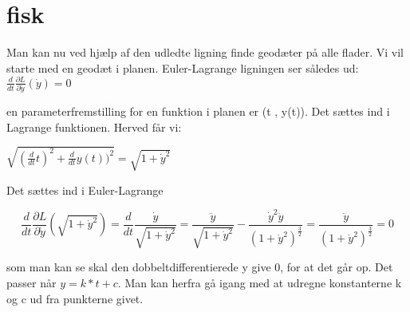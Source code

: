 \section{fisk}
Man kan nu ved hjælp af den udledte ligning finde geodæter på alle flader. Vi vil starte med en geodæt i planen. Euler-Lagrange ligningen ser således ud:
$\frac{d}{dt} \frac{\partial L}{\partial \dot{y}}(\dot{y})=0$

en parameterfremstilling for en funktion i planen er (t , y(t)). Det sættes ind i Lagrange funktionen. Herved får vi:

$\sqrt{(\frac{d}{dt}t)^2+\frac{d}{dt}y(t))^2}=\sqrt{1+\dot{y}^2}$

Det sættes ind i Euler-Lagrange
 
\begin{equation}
\frac{d}{dt} \frac{\partial L}{\partial \dot{y}}(\sqrt{1+\dot{y}^2})=\frac{d}{dt} \frac{\dot{y}}{\sqrt{1+\dot{y}^2}} = \frac{\ddot{y}}{\sqrt{1+\dot{y}^2}}-\frac{\dot{y}^2\ddot{y}}{(1+\dot{y}^2)^\frac{3}{2}}=\frac{\ddot{y}}{(1+\dot{y}^2)^\frac{3}{2}}=0
\end{equation}

som man kan se skal den dobbeltdifferentierede y give 0, for at det går op. Det passer når $y=k*t+c$. Man kan herfra gå igang med at udregne konstanterne k og c ud fra punkterne givet.